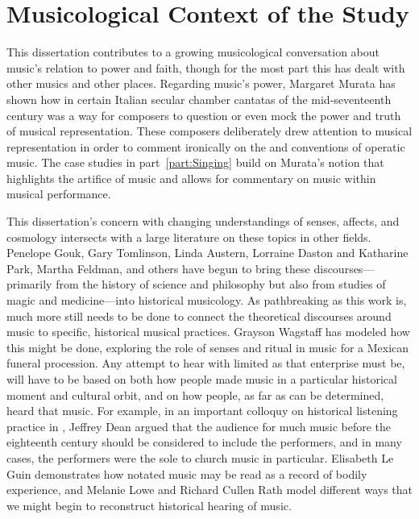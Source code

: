 \section{%
Musicological Context of the Study
}

This dissertation contributes to a growing musicological conversation about music's relation to power and faith, though for the most part this has dealt with other musics and other places.
Regarding music's power, Margaret Murata has shown how  in certain Italian secular chamber cantatas of the mid-seventeenth century was a way for composers to question or even mock the power and truth of musical representation.%
	\autocite{Murata:Singing}
These composers deliberately drew attention to musical representation in order to comment ironically on the  and conventions of operatic music.
The case studies in part~\ref{part:Singing} build on Murata's notion that  highlights the artifice of music and allows for commentary on music within musical performance.

This dissertation's concern with changing understandings of senses, affects, and cosmology intersects with a large literature on these topics in other fields. 
Penelope Gouk, Gary Tomlinson, Linda Austern, Lorraine Daston and Katharine Park, Martha Feldman, and others have begun to bring these discourses---primarily from the history of science and philosophy but also from studies of magic and medicine---into historical musicology.%
	\autocites{Gouk:MusicScienceMagic}{Gouk:Harmonics}{Gouk:Sciences}{Gouk:RepresentingEmotions}{Tomlinson:Magic}{Austern:Nature}{Daston:Wonders}{Feldman:Passions}
As pathbreaking as this work is, much more still needs to be done to connect the theoretical discourses around music to specific, historical musical practices. 
Grayson Wagstaff has modeled how this might be done, exploring the role of senses and ritual in music for a Mexican funeral procession.%
	\autocite{Wagstaff:Processions}	
Any attempt to hear with  limited as that enterprise must be, will have to be based on both how people made music in a particular historical moment and cultural orbit, and on how people, as far as can be determined, heard that music.%
	\autocite{Burstyn:PeriodEar}
For example, in an important colloquy on historical listening practice in , Jeffrey Dean argued that the audience for much music before the eighteenth century should be considered to include the performers, and in many cases, the performers were the sole  to church music in particular.%
	\autocite{Dean:ListeningPolyphony}
Elisabeth Le Guin demonstrates how notated music may be read as a record of bodily experience, and Melanie Lowe and Richard Cullen Rath model different ways that we might begin to reconstruct historical hearing of music.
	\autocites{LeGuin:BoccheriniBody}{Lowe:PleasureSymphony}{Rath:EarlyAmerica}

